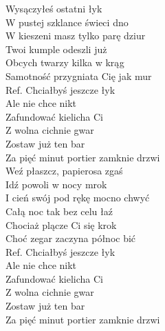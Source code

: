 
\begin{flushleft}
Wysączyłeś ostatni łyk \tab{}  \\
W pustej szklance świeci dno \tab{} \\
W kieszeni masz tylko parę dziur   \\
Twoi kumple odeszli już \tab{} \\
Obcych twarzy kilka w krąg \tab{}\\
Samotność przygniata Cię jak mur \\
\vskip 3mm
Ref. Chciałbyś jeszcze łyk \tab{} \\
\hspace{0.9cm}Ale nie chce nikt \tab{}  \\
\hspace{0.9cm}Zafundować kielicha Ci \tab{}\\
\hspace{0.9cm}Z wolna cichnie gwar \tab{}\\
\hspace{0.9cm}Zostaw już ten bar \tab{}\\
\hspace{0.9cm}Za pięć minut portier zamknie drzwi \\
\vskip 3mm
Weź płaszcz, papierosa zgaś \\
Idź powoli w nocy mrok \\
I cień swój pod rękę mocno chwyć \\
Całą noc tak bez celu łaź \\
Chociaż plącze Ci się krok \\
Choć zegar zaczyna północ bić \\
\vskip 3mm
Ref. Chciałbyś jeszcze łyk  \\
\hspace{0.9cm}Ale nie chce nikt   \\
\hspace{0.9cm}Zafundować kielicha Ci \\
\hspace{0.9cm}Z wolna cichnie gwar \\
\hspace{0.9cm}Zostaw już ten bar \\
\hspace{0.9cm}Za pięć minut portier zamknie drzwi \\
\end{flushleft}
\clearpage
